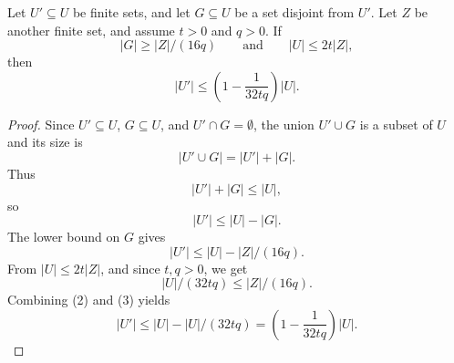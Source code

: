 \begin{helper}
Let \(U'\subseteq U\) be finite sets, and let \(G\subseteq U\) be a set
disjoint from \(U'\).  Let \(Z\) be another finite set, and assume
\(t>0\) and \(q>0\).  If
\[
  |G|\ge |Z|/(16q)
  \qquad\text{and}\qquad
  |U|\le2t|Z|,
\]
then
\[
  |U'|\le\left(1-\frac1{32tq}\right)|U|.
\]
\end{helper}
\begin{proof}
Since \(U'\subseteq U\), \(G\subseteq U\), and \(U'\cap G=\emptyset\), the
union \(U'\cup G\) is a subset of \(U\) and its size is
\[
  |U'\cup G|=|U'|+|G|.
\]
Thus
\[
  |U'|+|G|\le |U|,
\]
so
\[
  |U'|\le |U|-|G|. \tag{1}
\]
The lower bound on \(G\) gives
\[
  |U'|\le |U|-|Z|/(16q). \tag{2}
\]
From \(|U|\le2t|Z|\), and since \(t,q>0\), we get
\[
  |U|/(32tq)\le |Z|/(16q). \tag{3}
\]
Combining (2) and (3) yields
\[
  |U'|\le |U|-|U|/(32tq)
  =\left(1-\frac1{32tq}\right)|U|.
\]
\end{proof}

